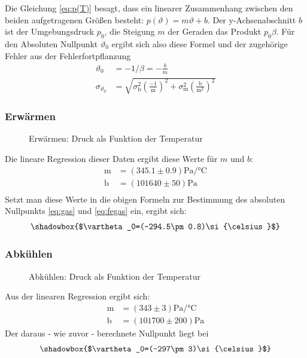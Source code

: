 \documentclass[12pt,a4paper,titlepage,headinclude,bibtotoc]{scrartcl}
\begin{document}
Die Gleichung \eqref{eq:p(T)} besagt, dass ein linearer Zusammenhang  zwischen den beiden aufgetragenen Größen besteht:
$p(\vartheta)=m\vartheta+b$.
Der y-Achsenabschnitt $b$ ist der Umgebungsdruck $p_0$, die Steigung $m$ der Geraden das Produkt $p_0\beta$.
Für den Absoluten Nullpunkt $\vartheta_0$ ergibt sich also diese Formel und der zugehörige Fehler aus der Fehlerfortpflanzung
\begin{align}
	\vartheta_0&=-1/\beta=-\frac{b}{m}
	\label{eq:gas}\\
	\sigma_{\vartheta_0}&=\sqrt{\sigma_\text{b}^2\left(\frac{-1}{\text{m}}\right)^2+\sigma_\text{m}^2\left(\frac{\text{b}}{\text{m}^2}\right)^2}
	\label{eq:fegas}
\end{align}
 
\subsubsection{Erwärmen}
\label{sec:gas1}
\begin{figure}[!h]
\centering

\caption{Erwärmen: Druck als Funktion der Temperatur}
\label{fig:gas1}
\end{figure}
Die lineare Regression dieser Daten ergibt diese Werte für $m$ und $b$:
\begin{align*}
	\text{m} &= (345.1\pm0.9)\si{\pascal/\celsius}\\
	\text{b} &= (101640\pm50)\si{\pascal}\\
\end{align*}
Setzt man diese Werte in die obigen Formeln zur Bestimmung des absoluten Nullpunkts \eqref{eq:gas} und \eqref{eq:fegas} ein, ergibt sich:
$$\shadowbox{$\vartheta_0=(-294.5\pm0.8)\si{\celsius}$}$$

\subsubsection{Abkühlen}
\label{sec:gas2}
\begin{figure}[!h]
\centering

\caption{Abkühlen: Druck als Funktion der Temperatur}
\label{fig:gas2}
\end{figure}
Aus der linearen Regression ergibt sich:
\begin{align}
	\text{m} &= (343\pm3)\si{\pascal/\celsius}\\
	\text{b} &= (101700\pm200)\si{\pascal}
\end{align}
Der daraus - wie zuvor - berechnete Nullpunkt liegt bei
$$\shadowbox{$\vartheta_0=(-297\pm3)\si{\celsius}$}$$
\end{document}
